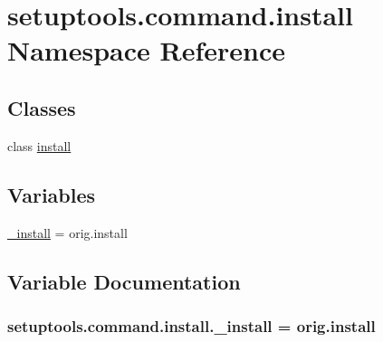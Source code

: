 \hypertarget{namespacesetuptools_1_1command_1_1install}{}\section{setuptools.\+command.\+install Namespace Reference}
\label{namespacesetuptools_1_1command_1_1install}
\subsection*{Classes}
\begin{DoxyCompactItemize}
\item 
class \hyperlink{classsetuptools_1_1command_1_1install_1_1install}{install}
\end{DoxyCompactItemize}
\subsection*{Variables}
\begin{DoxyCompactItemize}
\item 
\hyperlink{namespacesetuptools_1_1command_1_1install_a1e1b936dc01098bb7e9fde038bc871b9}{\+\_\+install} = orig.\+install
\end{DoxyCompactItemize}


\subsection{Variable Documentation}
\hypertarget{namespacesetuptools_1_1command_1_1install_a1e1b936dc01098bb7e9fde038bc871b9}{}
\subsubsection[{\+\_\+install}]{\setlength{\rightskip}{0pt plus 5cm}setuptools.\+command.\+install.\+\_\+install = orig.\+install}\label{namespacesetuptools_1_1command_1_1install_a1e1b936dc01098bb7e9fde038bc871b9}
